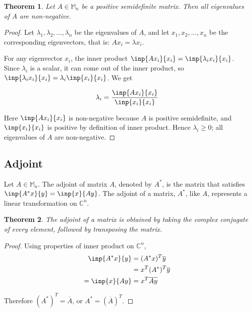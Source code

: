 \documentclass[twofold]{article}
\newcommand*\conj[1]{\overline{#1}}
\newcommand*\adj[1]{#1^*}
\newcommand*\trp[1]{#1^T}
\theoremstyle{plain}
\newtheorem{theorem}{Theorem}
\theoremstyle{definition}
\theoremstyle{remark}
\begin{document}
\begin{theorem} Let \(A \in \mathbb{M}_n\) be a positive semidefinite matrix. Then all eigenvalues of \(A\) are non-negative. \end{theorem}
\begin{proof} Let \(\lambda_1, \lambda_2, \ldots , \lambda_n\) be the eigenvalues of \(A\), and let \(x_1, x_2, \ldots , x_n\) be the corresponding eigenvectors, that is: \(Ax_i = \lambda x_i\). 

 For any eigenvector \(x_i\), the inner product \(\inp{Ax_i}{x_i} = \inp{\lambda_i x_i}{x_i}\). Since \(\lambda_i\) is a scalar, it can come out of the inner product, so  \( \inp{\lambda_i x_i}{x_i}  = \lambda_i \inp{x_i}{x_i}\). We get

\[\lambda_i = \frac{\inp{Ax_i}{x_i}}{\inp{x_i}{x_i}}\]

Here \(\inp{Ax_i}{x_i} \) is non-negative because \(A\) is positive semidefinite, and \(\inp{x_i}{x_i}\) is positive by definition of inner product. Hence \(\lambda_i \ge 0\); all eigenvalues of \(A\) are non-negative. \end{proof}


\subsection{Adjoint}

Let \(A \in \mathbb{M}_n\). The adjoint of matrix \(A\), denoted by \(\adj{A}\), is the matrix that  satisfies \(\inp{\adj{A}x}{y} = \inp{x}{Ay}\). The adjoint of a matrix, \(\adj{A}\), like \(A\), represents a linear transformation on \(\mathbb{C}^n\).

\begin{theorem} The adjoint of a matrix is obtained by taking the complex conjugate of every element, followed by transposing the matrix. \end{theorem}

\begin{proof} Using properties of inner product on \(\mathbb{C}^n\),
\begin{equation*} \begin{split}
\inp{\adj{A}x}{y} & = \trp{(\adj{A}x)} \conj{y}  \\
& = \trp{x} \trp{(\adj{A})} \conj{y}\\
= \inp{x}{Ay} & = \trp{x} \conj{Ay} 
\end{split} \end{equation*}

Therefore \(\trp{(\adj{A})} = \conj{A}\), or \(\adj{A} = \trp{(\conj{A})}\). \end{proof}
\end{document}
